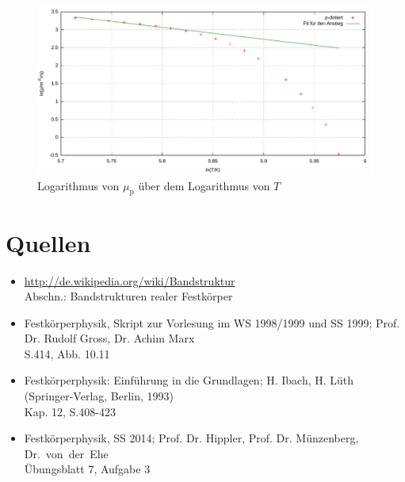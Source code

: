 \documentclass[numbers=noenddot,14pt,a4paper]{scrartcl}
\newcommand{\ix}[1]{_\text{#1}}
\begin{document}
\begin{figure}[H]
	\includegraphics[width=\textwidth]{messwerte/beweglichkeitp.pdf}
	\caption{Logarithmus von $\mu\ix{p}$ über dem Logarithmus von $T$} \label{img:mu-p}
\end{figure}
\section{Quellen}
\begin{itemize}
	\item{\url{http://de.wikipedia.org/wiki/Bandstruktur}\\ Abschn.: Bandstrukturen realer Festkörper}
	\item{Festkörperphysik, Skript zur Vorlesung im WS 1998/1999 und SS 1999; Prof. Dr. Rudolf Gross, Dr. Achim Marx\\
		S.414, Abb. 10.11}
	\item{Festkörperphysik: Einführung in die Grundlagen; H. Ibach, H. Lüth\\
	(Springer-Verlag, Berlin, 1993)\\
		Kap. 12, S.408-423}
	\item{Festkörperphysik, SS 2014; Prof. Dr. Hippler, Prof. Dr. Münzenberg,\\ \mbox{Dr. von der Ehe}\\
		Übungsblatt 7, Aufgabe 3}
\end{itemize}
\end{document}

